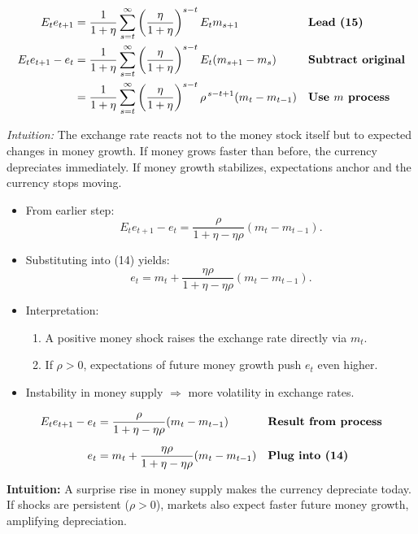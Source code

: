 \documentclass[12pt]{article}
\begin{document}
\singlespacing
\begin{align}
E_t e_{t+1} &= \frac{1}{1+\eta}\sum_{s=t}^\infty \left(\frac{\eta}{1+\eta}\right)^{s-t} E_t m_{s+1} && \text{\textbf{Lead (15)}} \\
E_t e_{t+1} - e_t &= \frac{1}{1+\eta}\sum_{s=t}^\infty \left(\frac{\eta}{1+\eta}\right)^{s-t} E_t(m_{s+1}-m_s) && \text{\textbf{Subtract original}} \\
&= \frac{1}{1+\eta}\sum_{s=t}^\infty \left(\frac{\eta}{1+\eta}\right)^{s-t} \rho^{\,s-t+1}(m_t - m_{t-1}) && \text{\textbf{Use $m$ process}}
\end{align}

\textit{Intuition:}  
The exchange rate reacts not to the money stock itself but to expected changes in money growth. If money grows faster than before, the currency depreciates immediately. If money growth stabilizes, expectations anchor and the currency stops moving.

\begin{itemize}
    \item From earlier step: 
    \[
    E_t e_{t+1} - e_t = \frac{\rho}{1+\eta - \eta\rho}(m_t - m_{t-1}).
    \]
    \item Substituting into (14) yields:
    \[
    e_t = m_t + \frac{\eta \rho}{1+\eta - \eta\rho}(m_t - m_{t-1}).
    \]
    \item Interpretation:
    \begin{enumerate}
        \item A positive money shock raises the exchange rate directly via $m_t$.  
        \item If $\rho > 0$, expectations of future money growth push $e_t$ even higher.  
    \end{enumerate}
    \item Instability in money supply $\Rightarrow$ more volatility in exchange rates.
\end{itemize}

\singlespacing
\begin{align}
E_t e_{t+1} - e_t &= \frac{\rho}{1+\eta - \eta\rho}(m_t - m_{t-1}) && \text{\textbf{Result from process}} \\[6pt]
e_t &= m_t + \frac{\eta\rho}{1+\eta - \eta\rho}(m_t - m_{t-1}) && \text{\textbf{Plug into (14)}}
\end{align}

\textbf{Intuition:} A surprise rise in money supply makes the currency depreciate today. If shocks are persistent ($\rho > 0$), markets also expect faster future money growth, amplifying depreciation.  
\end{document}
